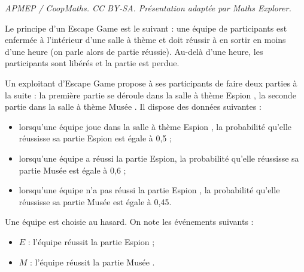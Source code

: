 \documentclass[10pt]{article}
\begin{document}
\noindent\textit{APMEP / CoopMaths. CC BY-SA. Présentation adaptée par Maths Explorer.}\par\medskip
\medskip

Le principe d'un Escape Game est le suivant : une équipe de participants est enfermée à l'intérieur d'une salle à thème et doit réussir à en sortir en moins d'une heure (on parle alors de partie réussie). Au-delà d'une heure, les participants sont libérés et la partie est perdue.

Un exploitant d'Escape Game propose à ses participants de faire deux parties à la suite : la première partie se déroule dans la salle à thème \og Espion \fg, la seconde partie dans la salle à thème \og Musée \fg{}. Il dispose des données suivantes :
\begin{itemize}
\item lorsqu'une équipe joue dans la salle à thème \og Espion \fg{}, la probabilité qu'elle réussisse sa partie \og Espion \fg{} est égale à 0,5 ;
\item lorsqu'une équipe a réussi la partie \og Espion\fg, la probabilité qu'elle réussisse sa partie \og Musée \fg{} est égale à 0,6 ;
\item lorsqu'une équipe n'a pas réussi la partie \og Espion \fg, la probabilité qu'elle réussisse sa partie \og Musée \fg{} est égale à 0,45.
\end{itemize}
 
Une équipe est choisie au hasard. On note les événements suivants :
\begin{itemize}
\item $E$ : \og l'équipe réussit la partie \og Espion \fg{} ;
\item $M$ : \og l'équipe réussit la partie \og Musée \fg.
\end{itemize} 

\medskip
\end{document}
